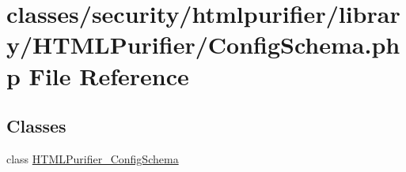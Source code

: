 \hypertarget{ConfigSchema_8php}{\section{classes/security/htmlpurifier/library/\+H\+T\+M\+L\+Purifier/\+Config\+Schema.php File Reference}
\label{ConfigSchema_8php}
}
\subsection*{Classes}
\begin{DoxyCompactItemize}
\item 
class \hyperlink{classHTMLPurifier__ConfigSchema}{H\+T\+M\+L\+Purifier\+\_\+\+Config\+Schema}
\end{DoxyCompactItemize}
